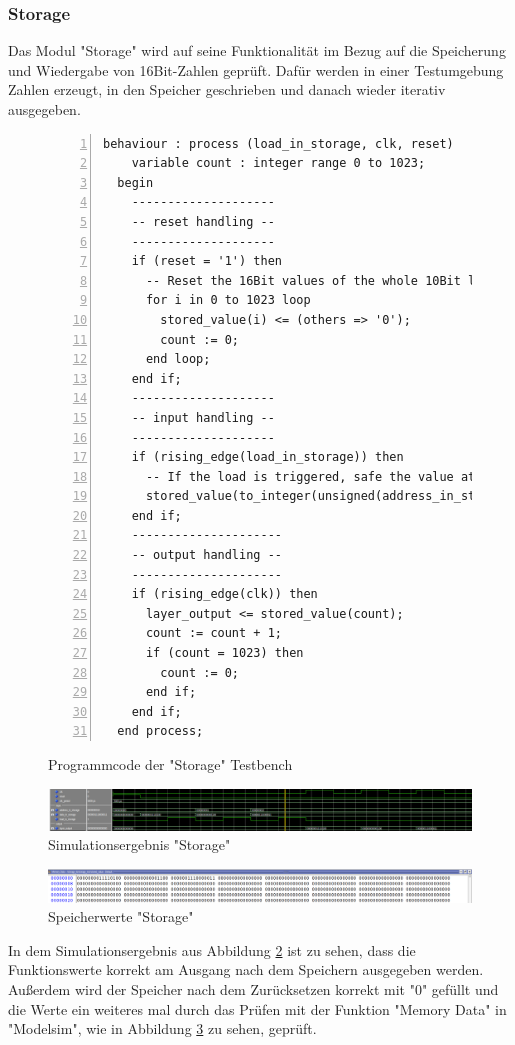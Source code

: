 \documentclass{article}
\numberwithin{equation}{section}
\begin{document}
\subsubsection{Storage}
Das Modul "Storage" wird auf seine Funktionalität im Bezug auf die Speicherung und Wiedergabe
von 16Bit-Zahlen geprüft. Dafür werden in einer Testumgebung Zahlen erzeugt, in den Speicher 
geschrieben und danach wieder iterativ ausgegeben.
\begin{figure}[htbp]
\begin{lstlisting}[style=VHDL,numbers=left,stepnumber=1,style=myCustomMatlabStyle,basicstyle=\footnotesize]
behaviour : process (load_in_storage, clk, reset)
    variable count : integer range 0 to 1023;
  begin
    --------------------
    -- reset handling --
    --------------------
    if (reset = '1') then
      -- Reset the 16Bit values of the whole 10Bit long array.
      for i in 0 to 1023 loop
        stored_value(i) <= (others => '0');
        count := 0;
      end loop;
    end if;
    --------------------
    -- input handling --
    --------------------
    if (rising_edge(load_in_storage)) then
      -- If the load is triggered, safe the value at the address.
      stored_value(to_integer(unsigned(address_in_storage))) <= data_in_storage;
    end if;
    ---------------------
    -- output handling --
    ---------------------
    if (rising_edge(clk)) then
      layer_output <= stored_value(count);
      count := count + 1;
      if (count = 1023) then
        count := 0;
      end if;
    end if;
  end process;
\end{lstlisting}
\caption{Programmcode der "Storage" Testbench} \label{code:storage_testbench}
\end{figure}
\begin{figure}[htb!]
    \begin{center}
      \includegraphics[width=15cm]{SimulationPictures/storage_sim.png}
    \end{center}
    \caption{Simulationsergebnis "Storage"} \label{fig:storage_sim}
  \end{figure}
\FloatBarrier
\begin{figure}[htb!]
    \begin{center}
      \includegraphics[width=15cm]{SimulationPictures/storage_memory_sim.png}
    \end{center}
    \caption{Speicherwerte "Storage"} \label{fig:storage_memory_sim}
  \end{figure}
\FloatBarrier
In dem Simulationsergebnis aus Abbildung \ref{fig:storage_sim} ist zu sehen, dass die 
Funktionswerte korrekt am Ausgang nach dem Speichern ausgegeben werden. Außerdem wird 
der Speicher nach dem Zurücksetzen korrekt mit "0" gefüllt und die Werte ein weiteres
mal durch das Prüfen mit der Funktion "Memory Data" in "Modelsim", wie in Abbildung
\ref{fig:storage_memory_sim} zu sehen, geprüft.
\pagebreak
\end{document}
